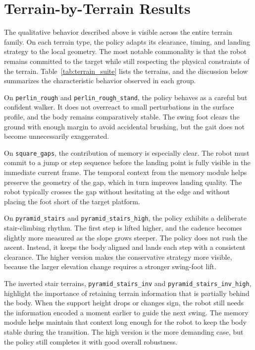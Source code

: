 \section{Terrain-by-Terrain Results}
\label{sec:terrain_by_terrain_results}

The qualitative behavior described above is visible across the entire terrain family. On each terrain type, the policy adapts its clearance, timing, and landing strategy to the local geometry. The most notable commonality is that the robot remains committed to the target while still respecting the physical constraints of the terrain. Table~\ref{tab:terrain_suite} lists the terrains, and the discussion below summarizes the characteristic behavior observed in each group.

On \texttt{perlin\_rough} and \texttt{perlin\_rough\_stand}, the policy behaves as a careful but confident walker. It does not overreact to small perturbations in the surface profile, and the body remains comparatively stable. The swing foot clears the ground with enough margin to avoid accidental brushing, but the gait does not become unnecessarily exaggerated.

On \texttt{square\_gaps}, the contribution of memory is especially clear. The robot must commit to a jump or step sequence before the landing point is fully visible in the immediate current frame. The temporal context from the memory module helps preserve the geometry of the gap, which in turn improves landing quality. The robot typically crosses the gap without hesitating at the edge and without placing the foot short of the target platform.

On \texttt{pyramid\_stairs} and \texttt{pyramid\_stairs\_high}, the policy exhibits a deliberate stair-climbing rhythm. The first step is lifted higher, and the cadence becomes slightly more measured as the slope grows steeper. The policy does not rush the ascent. Instead, it keeps the body aligned and lands each step with a consistent clearance. The higher version makes the conservative strategy more visible, because the larger elevation change requires a stronger swing-foot lift.

The inverted stair terrains, \texttt{pyramid\_stairs\_inv} and \texttt{pyramid\_stairs\_inv\_high}, highlight the importance of retaining terrain information that is partially behind the body. When the support height drops or changes sign, the robot still needs the information encoded a moment earlier to guide the next swing. The memory module helps maintain that context long enough for the robot to keep the body stable during the transition. The high version is the more demanding case, but the policy still completes it with good overall robustness.

